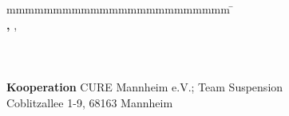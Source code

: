 \begin{titlepage}
\vfill

\flushleft
\begin{spacing}{1.2}
\begin{tabbing}
		mmmmmmmmmmmmmmmmmmmmmmmm              \= \kill
		\textbf{\langdbbearbeitungszeit} \> \zeitraum\\
		\textbf{\langdbmatriknr, \langdbkurs} \> \matrikelnr, \kurs\\
		\textbf{\langdbfirma} \> \firma\\
								\> \firmenort\\
		\textbf{\langdbgutachter}              \>  \gutachter\\
		\textbf{Kooperation}               \>  CURE Mannheim e.V.; Team Suspension\\
		\>  Coblitzallee 1-9, 68163 Mannheim\\
		
\end{tabbing}
\end{spacing}

\vspace{1cm}
\restoregeometry
\end{titlepage}